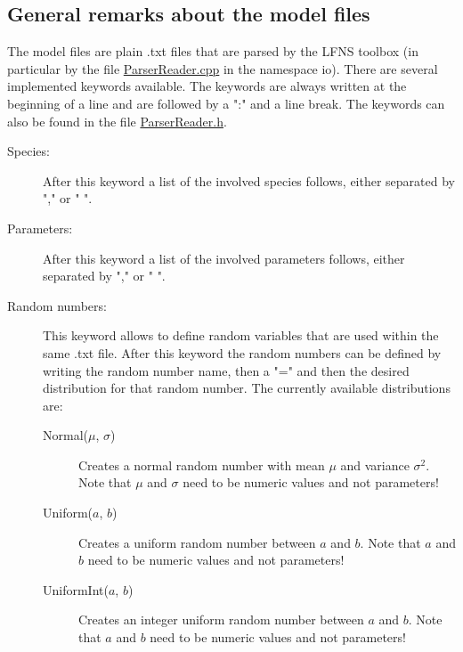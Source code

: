 \documentclass[11pt]{article} %
\begin{document}
\subsection{General remarks about the model files}
The model files are plain .txt files that are parsed by the LFNS toolbox (in particular by the file \href{https://github.com/Mijan/LFNS/blob/publishable/src/io/ParserReader.cpp}{ParserReader.cpp} in the namespace io). There are several implemented keywords available. The keywords are always written at the beginning of a line and are followed by a ":" and a line break. The keywords can also be found in the file \href{https://github.com/Mijan/LFNS/blob/publishable/src/io/ParserReader.h}{ParserReader.h}.
\begin{description}
\item[Species:] After this keyword a list of the involved species follows, either separated by "," or " ".
\item[Parameters:] After this keyword a list of the involved parameters follows, either separated by "," or " ".
\item[Random numbers:] This keyword allows to define random variables that are used within the same .txt file. After this keyword the random numbers can be defined by writing the random number name, then a "=" and then the desired distribution for that random number. The currently available distributions are: 
\begin{description}
\item[Normal($\mu$, $\sigma$)] Creates a normal random number with mean $\mu$ and variance $\sigma^2$. Note that $\mu$ and $\sigma$ need to be numeric values and not parameters!
\item[Uniform($a$, $b$)] Creates a uniform random number between $a$ and $b$. Note that $a$ and $b$ need to be numeric values and not parameters!
\item[UniformInt($a$, $b$)] Creates an integer uniform random number between $a$ and $b$. Note that $a$ and $b$ need to be numeric values and not parameters!

\end{description}
\end{description}
\end{document}

